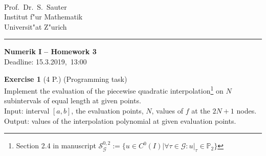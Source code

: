 \documentclass[11pt,a4paper,DIV9,german]{scrartcl}
\def\blnr{3}              %
\def\sdate{15.3.2019,}     %
\theoremstyle{break}   %
\begin{document}
\parbox{0ex}{    }   \\

\parbox{25ex}{
  Prof.~Dr.~S.~Sauter\\
  Institut f"ur Mathematik\\
  Universit"at Z"urich
  }
%
\rule[0cm]{0.cm}{.01cm}                  
\hfill  \parbox{0.6\textwidth}{
  {\sf\LARGE\bfseries Numerik I}
  {\sf\Large\bfseries \;\;--\;\; Homework \blnr }\\[1.5ex]
  Deadline: \sdate\ 13:00
  }



\vspace{10ex}




%
%

\textbf{Exercise 1} (4 P.) (Programming task)\\
Implement the evaluation of the piecewise quadratic interpolation\footnote{Section 2.4 in manuscript $\mathcal{S}^{0,2}_{\mathcal{G}} := \lbrace u\in C^0(I) | \forall \tau \in \mathcal{G } : u|_\tau \in \mathbb{P}_2 \rbrace $} on $N$ subintervals of equal length at given points.  \\
Input: interval \([a,b]\),  the evaluation points, \(N\), values of \(f\) at the \(2N+1\) nodes.\\
Output: values of the interpolation polynomial at given evaluation points.
\end{document}
